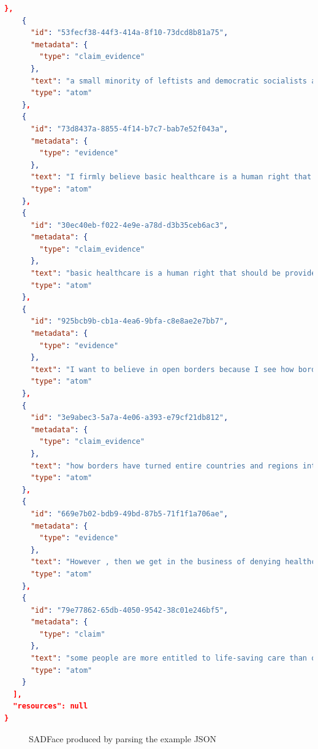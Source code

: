 \documentclass[12pt,a4paper]{article}
\begin{document}
\begin{lstlisting}[language=json,firstnumber=1]
    }, 
    {
      "id": "53fecf38-44f3-414a-8f10-73dcd8b81a75", 
      "metadata": {
        "type": "claim_evidence"
      }, 
      "text": "a small minority of leftists and democratic socialists advocate for open bordersuniversal healthcare should be a priority in the Democratic Party", 
      "type": "atom"
    }, 
    {
      "id": "73d8437a-8855-4f14-b7c7-bab7e52f043a", 
      "metadata": {
        "type": "evidence"
      }, 
      "text": "I firmly believe basic healthcare is a human right that should be provided by the government to all people regardless of immigration status .", 
      "type": "atom"
    }, 
    {
      "id": "30ec40eb-f022-4e9e-a78d-d3b35ceb6ac3", 
      "metadata": {
        "type": "claim_evidence"
      }, 
      "text": "basic healthcare is a human right that should be provided by the government to all people regardless of immigration status", 
      "type": "atom"
    }, 
    {
      "id": "925bcb9b-cb1a-4ea6-9bfa-c8e8ae2e7bb7", 
      "metadata": {
        "type": "evidence"
      }, 
      "text": "I want to believe in open borders because I see how borders have turned entire countries and regions into war zones ( not only in the American southwest but in India/Pakistan , Israel/Palestine , etc ) ... However , I ca n't help but feel that if we had both universal healthcare and open borders , we would create a ` drain ' in which people could come over from other countries , obtain free healthcare , and leave without making enough of a contribution to the American economy to sustain the system .", 
      "type": "atom"
    }, 
    {
      "id": "3e9abec3-5a7a-4e06-a393-e79cf21db812", 
      "metadata": {
        "type": "claim_evidence"
      }, 
      "text": "how borders have turned entire countries and regions into warpeople could come over from other countriesa contribution to the American economy to sustain the system", 
      "type": "atom"
    }, 
    {
      "id": "669e7b02-bdb9-49bd-87b5-71f1f1a706ae", 
      "metadata": {
        "type": "evidence"
      }, 
      "text": "However , then we get in the business of denying healthcare based on immigration status which is morally wrong .", 
      "type": "atom"
    }, 
    {
      "id": "79e77862-65db-4050-9542-38c01e246bf5", 
      "metadata": {
        "type": "claim"
      }, 
      "text": "some people are more entitled to life-saving care than others based on a piece of documentation", 
      "type": "atom"
    }
  ], 
  "resources": null
}

    \end{lstlisting}
\begin{figure}[H]
    \centering
    \caption{SADFace produced by parsing the example JSON}
    \label{fig:sadfaceparse}
\end{figure}{}
\end{document}
